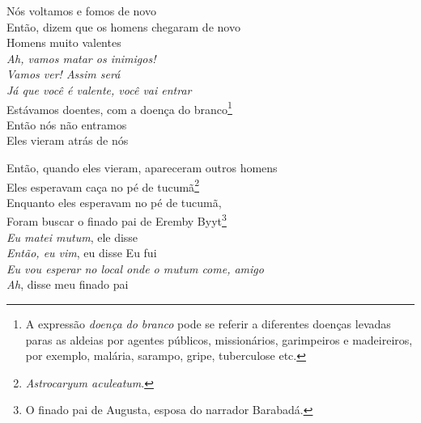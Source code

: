\begin{linenumbers}\begingroup\raggedright
 
\noindent   Nós voltamos e fomos de novo\\
  Então, dizem que os homens chegaram de novo\\
  Homens muito valentes\\
  \textit{Ah, vamos matar os inimigos!}\\
  \textit{Vamos ver! Assim será}\\
  \textit{Já que você é valente, você vai entrar}\\
  Estávamos doentes, com a doença do branco\footnote{A expressão
   \textit{doença do branco} pode se referir a diferentes doenças levadas
   paras as aldeias por agentes públicos, missionários, garimpeiros e
   madeireiros, por exemplo, malária, sarampo, gripe, tuberculose etc.}\\
  Então nós não entramos\\
  Eles vieram atrás de nós
 
\end{linenumbers}\endgroup

\bigskip

\begin{linenumbers}\begingroup\raggedright
 
\noindent   Então, quando eles vieram, apareceram outros homens\\
  Eles esperavam caça no pé de tucumã\footnote{\textit{Astrocaryum
   aculeatum}.}\\
  Enquanto eles esperavam no pé de tucumã,\\
  Foram buscar o finado pai de Eremby Byyt\footnote{O finado pai de
   Augusta, esposa do narrador Barabadá.}\\
  \textit{Eu matei mutum}, ele disse\\
  \textit{Então, eu vim}, eu disse
  Eu fui\\
  \textit{Eu vou esperar no local onde o mutum come, amigo}\\
  \textit{Ah}, disse meu finado pai
 
\end{linenumbers}\endgroup

